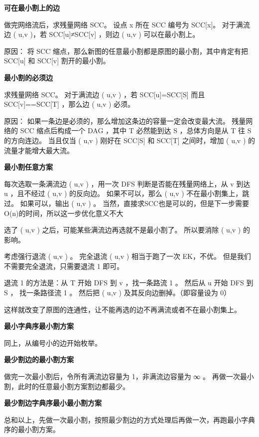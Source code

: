 \documentclass[a4paper,11pt]{article}
\begin{document}
     \textbf{可在最小割上的边}
     
     做完网络流后，求残量网络 SCC。 
     设点 x 所在 SCC 编号为 SCC[x]。 
     对于满流边 ( u,v )，若 SCC[u]≠SCC[v]
     ，则边 ( u,v ) 可以在最小割上。
     
     原因： 将 SCC 缩点，那么新图的任意最小割都是原图的最小割，其中肯定有把 SCC[u] 和 SCC[v] 割开的最小割。
     
     \textbf{最小割的必须边}
     
     求残量网络 SCC。 
     对于满流边 ( u,v ) ，若 SCC[u]=SCC[S] 而且 SCC[v]==SCC[T] ，那么边 ( u,v ) 必须。
     
     原因： 如果一条边是必须的，那么增加这条边的容量一定会改变最大流。 
     残量网络的 SCC 缩点后构成一个 DAG ，其中 T 必然能到达 S ，总体方向是从 T 往 S 的方向连边。 
     当且仅当 ( u,v ) 刚好在 SCC[S] 和 SCC[T] 之间时，增加 ( u,v ) 的流量才能增大最大流。
     
     \textbf{最小割任意方案}
     
     每次选取一条满流边 ( u,v ) ，用一次 DFS 判断是否能在残量网络上，从 v 到达 u ，且不经过 ( u,v ) 的反向边。 
     如果不可以，那么 ( u,v ) 不在最小割集上，跳过。 
     如果可以，输出 ( u,v ) 。 
     当然，直接求SCC也是可以的，但是下一步需要O(n)的时间，所以这一步优化意义不大
     
     选了 ( u,v ) 之后，可能某些满流边再选就不是最小割了。 
     所以要消除 ( u,v ) 的影响。
     
     考虑强行退流 ( u,v ) 。 
     完全退流 ( u,v ) 相当于跑了一次 EK，不优。 
     但是我们不需要完全退流，只需要退流 1 即可。
     
     退流 1 的方法是：从 T 开始 DFS 到 v ，找一条路流 1 。 
     然后从 u 开始 DFS 到 S ， 找一条路径流 1 。 
     然后把 ( u,v ) 及其反向边删掉。（即容量设为 0）
     
     这样就改变了原图的连通性，让不能再选的边不再满流或者不在最小割集上。
     
     \textbf{最小字典序最小割方案}
     
     同上，从编号小的边开始枚举。
     
     \textbf{最少割边的最小割方案}
     
     做完一次最小割后，令所有满流边容量为 1，非满流边容量为 ∞ 。
     再做一次最小割，此时的任意最小割方案割边都最少。
     
     \textbf{最少割边字典序最小最小割方案}
     
     总和以上，先做一次最小割，按照最少割边的方式处理后再做一次，再跑最小字典序的最小割方案。
    
\end{document}
